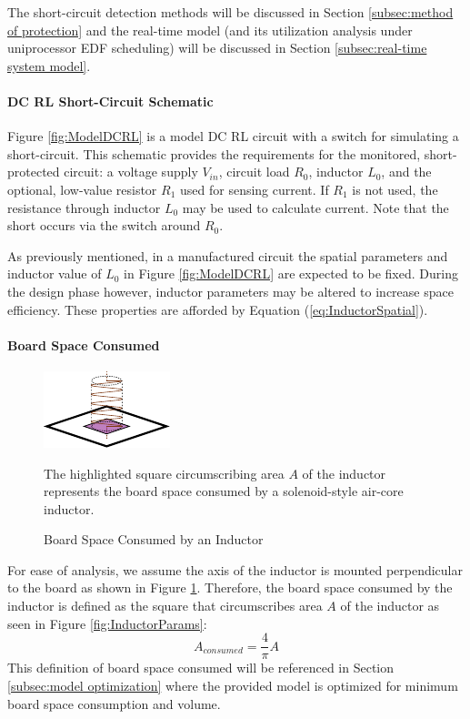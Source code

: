 The short-circuit detection methods will be discussed in Section \ref{subsec:method of protection} and the real-time model (and its utilization analysis under uniprocessor EDF scheduling) will be discussed in Section \ref{subsec:real-time system model}.

\paragraph{DC RL Short-Circuit Schematic}
Figure \ref{fig:ModelDCRL} is a model DC RL circuit with a switch for simulating a short-circuit. This schematic provides the requirements for the monitored, short-protected circuit: a voltage supply $V_{in}$, circuit load $R_{0}$, inductor $L_{0}$, and the optional, low-value resistor $R_{1}$ used for sensing current. If $R_{1}$ is not used, the resistance through inductor $L_{0}$ may be used to calculate current. Note that the short occurs via the switch around $R_{0}$.

As previously mentioned, in a manufactured circuit the spatial parameters and inductor value of $L_0$ in Figure \ref{fig:ModelDCRL} are expected to be fixed. During the design phase however, inductor parameters may be altered to increase space efficiency. These properties are afforded by Equation (\ref{eq:InductorSpatial}).

\paragraph{Board Space Consumed}
\begin{figure}
    \centering
    \includegraphics[scale=2.0]{img/Inductor_Perpendicular_Mount.pdf}
    \caption{Board Space Consumed by an Inductor} The highlighted square circumscribing area $A$ of the inductor represents the board space consumed by a solenoid-style air-core inductor.
    \label{fig:BoardSpaceConsumed}
\end{figure}
For ease of analysis, we assume the axis of the inductor is mounted perpendicular to the board as shown in Figure \ref{fig:BoardSpaceConsumed}. Therefore, the board space consumed by the inductor is defined as the square that circumscribes area $A$ of the inductor as seen in Figure \ref{fig:InductorParams}:
\begin{equation}\label{eq:AreaConsumed}
A_{consumed} = \frac{4}{\pi}A
\end{equation}
This definition of board space consumed will be referenced in Section \ref{subsec:model optimization} where the provided model is optimized for minimum board space consumption and volume.
